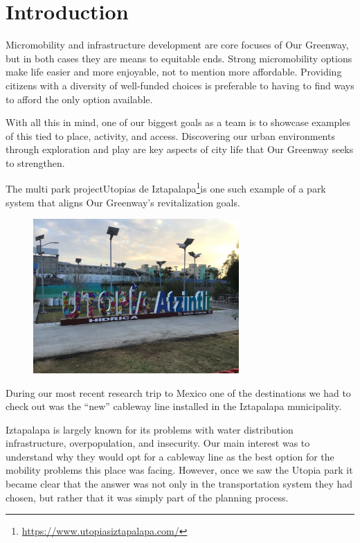 \documentclass[letter]{ourGreenwayBrand}
\begin{document}
\MakeBrandTitle

\section{Introduction}
Micromobility and infrastructure development are core focuses of Our Greenway, but in both cases they are means to equitable ends. Strong micromobility options make life easier and more enjoyable, not to mention more affordable. Providing citizens with a diversity of well-funded choices is preferable to having to find ways to afford the only option available.

With all this in mind, one of our biggest goals as a team is to showcase examples of this tied to place, activity, and access. Discovering our urban environments through exploration and play are key aspects of city life that Our Greenway seeks to strengthen.

The multi park projectUtopias de Iztapalapa\footnote{\url{https://www.utopiasiztapalapa.com/}}is one such example of a park system that aligns Our Greenway’s revitalization goals.

\begin{figure}[htbp]
  \centering
  \includegraphics[width=0.7\textwidth]{images/IMG_8088-1536x1152.jpg}
\end{figure}

During our most recent research trip to Mexico one of the destinations we had to check out was the “new” cableway line installed in the Iztapalapa municipality.

Iztapalapa is largely known for its problems with water distribution infrastructure, overpopulation, and insecurity. Our main interest was to understand why they would opt for a cableway line as the best option for the mobility problems this place was facing. However, once we saw the Utopia park it became clear that the answer was not only in the transportation system they had chosen, but rather that it was simply part of the planning process.
\end{document}
